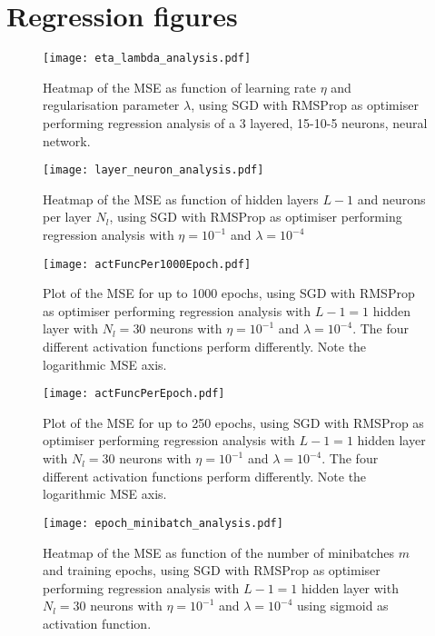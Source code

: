 \clearpage



\appendix

\section{Regression figures}

\begin{figure}[h!]
    \texttt{[image: eta\_lambda\_analysis.pdf]}
    \caption{Heatmap of the MSE as function of learning rate $\eta$ and regularisation parameter $\lambda$, using SGD with RMSProp as optimiser performing regression analysis of a 3 layered, 15-10-5 neurons, neural network. }
    \label{fig:reg_eta_lambda}
\end{figure}

\begin{figure}[h!]
    \texttt{[image: layer\_neuron\_analysis.pdf]}
    \caption{Heatmap of the MSE as function of hidden layers $L-1$ and neurons per layer $N_l$, using SGD with RMSProp as optimiser performing regression analysis with $\eta=10^{-1}$ and $\lambda=10^{-4}$ }
    \label{fig:reg_layer_neuron}
\end{figure}

\begin{figure}[h!]
    \texttt{[image: actFuncPer1000Epoch.pdf]}
    \caption{Plot of the MSE for up to 1000 epochs, using SGD with RMSProp as optimiser performing regression analysis with $L-1=1$ hidden layer with $N_l=30$ neurons with $\eta=10^{-1}$ and $\lambda=10^{-4}$. The four different activation functions perform differently. Note the logarithmic MSE axis.}
    \label{fig:reg_act_epoch1000}
\end{figure}

\begin{figure}[h!]
    \texttt{[image: actFuncPerEpoch.pdf]}
    \caption{Plot of the MSE for up to 250 epochs, using SGD with RMSProp as optimiser performing regression analysis with $L-1=1$ hidden layer with $N_l=30$ neurons with $\eta=10^{-1}$ and $\lambda=10^{-4}$. The four different activation functions perform differently. Note the logarithmic MSE axis.}
    \label{fig:reg_act_epoch}
\end{figure}

\begin{figure}[h!]
    \texttt{[image: epoch\_minibatch\_analysis.pdf]}
    \caption{Heatmap of the MSE as function of the number of minibatches $m$ and training epochs, using SGD with RMSProp as optimiser performing regression analysis with $L-1=1$ hidden layer with $N_l=30$ neurons with $\eta=10^{-1}$ and $\lambda=10^{-4}$ using sigmoid as activation function. }
    \label{fig:reg_minibatch_epoch}
\end{figure}





